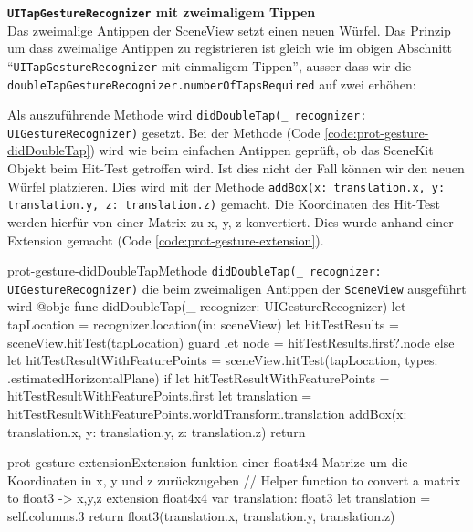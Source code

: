 \begin{description}
    \textbf{\texttt{UITapGestureRecognizer} mit zweimaligem Tippen}\\
    Das zweimalige Antippen der SceneView setzt einen neuen Würfel. Das Prinzip um dass zweimalige Antippen zu registrieren ist gleich wie im obigen Abschnitt "`\texttt{UITapGestureRecognizer} mit einmaligem Tippen"', ausser dass wir die \texttt{doubleTapGestureRecognizer.numberOfTapsRequired} auf zwei erhöhen:

    Als auszuführende Methode wird \texttt{didDoubleTap(\_ recognizer: UIGestureRecognizer)} gesetzt. Bei der Methode (Code \ref{code:prot-gesture-didDoubleTap}) wird wie beim einfachen Antippen geprüft, ob das SceneKit Objekt beim Hit-Test getroffen wird. Ist dies nicht der Fall können wir den neuen Würfel platzieren. Dies wird mit der Methode \texttt{addBox(x: translation.x, y: translation.y, z: translation.z)} gemacht. Die Koordinaten des Hit-Test werden hierfür von einer Matrix zu x, y, z konvertiert. Dies wurde anhand einer Extension gemacht (Code \ref{code:prot-gesture-extension}).

    \begin{code}{prot-gesture-didDoubleTap}{Methode \texttt{didDoubleTap(\_ recognizer: UIGestureRecognizer)} die beim zweimaligen Antippen der \texttt{SceneView} ausgeführt wird}
    @objc
    func didDoubleTap(_ recognizer: UIGestureRecognizer) {
        let tapLocation = recognizer.location(in: sceneView)
        let hitTestResults = sceneView.hitTest(tapLocation)
        guard let node = hitTestResults.first?.node else {
            let hitTestResultWithFeaturePoints = sceneView.hitTest(tapLocation, types: .estimatedHorizontalPlane)
            if let hitTestResultWithFeaturePoints = hitTestResultWithFeaturePoints.first {
                let translation = hitTestResultWithFeaturePoints.worldTransform.translation
                addBox(x: translation.x, y: translation.y, z: translation.z)
            }
            return
        }
    }
    \end{code}

    \begin{code}{prot-gesture-extension}{Extension funktion einer float4x4 Matrize um die Koordinaten in x, y und z zurückzugeben}
    // Helper function to convert a matrix to float3 -> x,y,z
    extension float4x4 {
        var translation: float3 {
            let translation = self.columns.3
            return float3(translation.x, translation.y, translation.z)
        }
    }
    \end{code}


\end{description}
